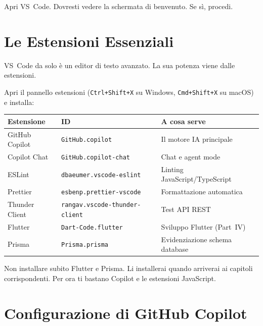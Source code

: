 \begin{checkpointbox}
Apri VS~Code. Dovresti vedere la schermata di benvenuto. Se sì, procedi.
\end{checkpointbox}

\section{Le Estensioni Essenziali}

VS~Code da solo è un editor di testo avanzato. La sua potenza viene dalle estensioni.

\begin{praticabox}[title={Pratica --- Installazione estensioni}]
Apri il pannello estensioni (\texttt{Ctrl+Shift+X} su Windows, \texttt{Cmd+Shift+X} su macOS) e installa:
\end{praticabox}

\begin{center}
\begin{tabularx}{\textwidth}{l l X}
\toprule
\textbf{Estensione} & \textbf{ID} & \textbf{A cosa serve} \\
\midrule
GitHub Copilot & \texttt{GitHub.copilot} & Il motore IA principale \\
Copilot Chat & \texttt{GitHub.copilot-chat} & Chat e agent mode \\
ESLint & \texttt{dbaeumer.vscode-eslint} & Linting JavaScript/TypeScript \\
Prettier & \texttt{esbenp.prettier-vscode} & Formattazione automatica \\
Thunder Client & \texttt{rangav.vscode-thunder-client} & Test API REST \\
Flutter & \texttt{Dart-Code.flutter} & Sviluppo Flutter (Part~IV) \\
Prisma & \texttt{Prisma.prisma} & Evidenziazione schema database \\
\bottomrule
\end{tabularx}
\end{center}

\begin{tipbox}
Non installare subito Flutter e Prisma. Li installerai quando arriverai ai capitoli corrispondenti. Per ora ti bastano Copilot e le estensioni JavaScript.
\end{tipbox}

\section{Configurazione di GitHub Copilot}

